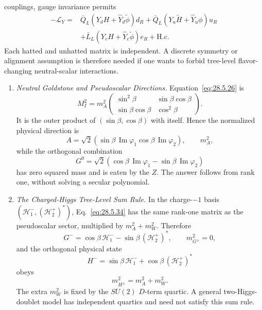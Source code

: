 \begin{enumerate}
\begin{enumerate}
      couplings, gauge invariance permits
      \[
      \begin{aligned}
        -\mathcal L_Y={}&
          \bar Q_L(Y_dH+\widehat Y_d\widetilde\phi)d_R
          +\bar Q_L(Y_u\widetilde H+\widehat Y_u\phi)u_R\\
          &+\bar L_L(Y_eH+\widehat Y_e\widetilde\phi)e_R
          +\mathrm{H.c.}
      \end{aligned}
      \]
      Each hatted and unhatted matrix is independent.  A discrete symmetry
      or alignment assumption is therefore needed if one wants to forbid
      tree-level flavor-changing neutral-scalar interactions.
  \end{enumerate}

  \begin{enumerate}
    \item \emph{Neutral Goldstone and Pseudoscalar Directions.}
    Equation~\eqref{eq:28.5.26} is
      \[
        M_I^2=m_A^2
        \begin{pmatrix}
          \sin^2\beta&\sin\beta\cos\beta\\
          \sin\beta\cos\beta&\cos^2\beta
        \end{pmatrix}.
      \]
      It is the outer product of
      \((\sin\beta,\cos\beta)\) with itself.  Hence the normalized
      physical direction is
      \[
        A=\sqrt2\left(
          \sin\beta\,\operatorname{Im}\varphi_1
          \cos\beta\,\operatorname{Im}\varphi_2\right),
        \qquad m_A^2,
      \]
      while the orthogonal combination
      \[
        G^0=\sqrt2\left(
          \cos\beta\,\operatorname{Im}\varphi_1
          -\sin\beta\,\operatorname{Im}\varphi_2\right)
      \]
      has zero squared mass and is eaten by the \(Z\).  The answer follows
      from rank one, without solving a secular polynomial.
    \item \emph{The Charged-Higgs Tree-Level Sum Rule.}
    In the charge-\(-1\) basis
      \((\mathcal H_1^-,(\mathcal H_2^+)^*)\),
      Eq.~\eqref{eq:28.5.34} has the same rank-one matrix as the
      pseudoscalar sector, multiplied by \(m_A^2+m_W^2\).  Therefore
      \[
        G^-=\cos\beta\,\mathcal H_1^-
           -\sin\beta\,(\mathcal H_2^+)^*,\qquad m_{G^\pm}^2=0,
      \]
      and the orthogonal physical state
      \[
        H^-=\sin\beta\,\mathcal H_1^-
           +\cos\beta\,(\mathcal H_2^+)^*
      \]
      obeys
      \[
        m_{H^\pm}^2=m_A^2+m_W^2.
      \]
      The extra \(m_W^2\) is fixed by the \(SU(2)\) \(D\)-term quartic.
      A general two-Higgs-doublet model has independent quartics and need
      not satisfy this sum rule.
  \end{enumerate}


\end{enumerate}
